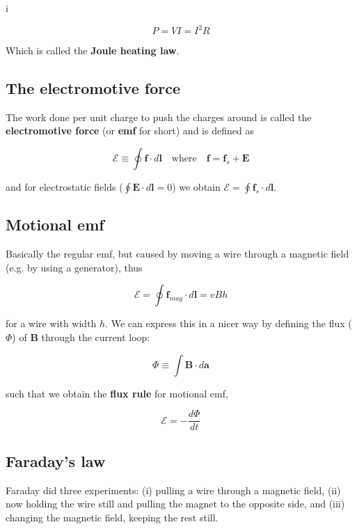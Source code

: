 i\documentclass[a4paper]{article}
\begin{document}
\begin{equation}
    P=VI=I^2R
\end{equation}

Which is called the \textbf{Joule heating law}.

\subsection{The electromotive force}
The work done per unit charge to push the charges around is called the \textbf{electromotive force} (or \textbf{emf} for short) and is defined as

\begin{equation}
    \mathcal{E}\equiv \oint\bm{f}\cdot d\bm{l}\quad\text{where}\quad \bm{f}=\bm{f}_s+\bm{E}
\end{equation}

and for electrostatic fields ($\oint \bm{E}\cdot d\bm{l}=0$) we obtain $\mathcal{E}=\oint\bm{f}_s\cdot d\bm{l}$.

\subsection{Motional emf}
Basically the regular emf, but caused by moving a wire through a magnetic field (e.g. by using a generator), thus

\begin{equation}
    \mathcal{E}=\oint \bm{f}_{mag}\cdot d\bm{l}=vBh
\end{equation}

for a wire with width $h$. We can express this in a nicer way by defining the flux ($\Phi$) of $\bm{B}$ through the current loop:

\begin{equation}
    \Phi\equiv\int\bm{B}\cdot d\bm{a}
\end{equation}

such that we obtain the \textbf{flux rule} for motional emf,

\begin{equation}
    \mathcal{E}=-\frac{d\Phi}{dt}
\end{equation}

\subsection{Faraday's law}

Faraday did three experiments: (i) pulling a wire through a magnetic field, (ii) now holding the wire still and pulling the magnet to the opposite side, and (iii) changing the magnetic field, keeping the rest still.
\end{document}
